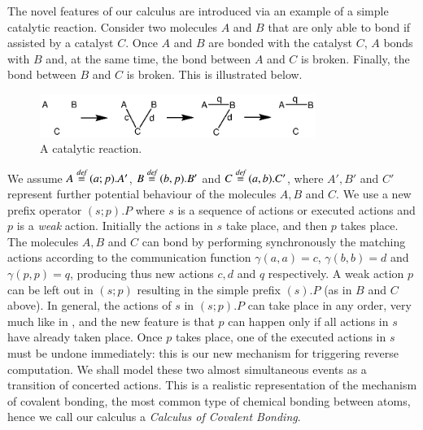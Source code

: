 The novel features of our calculus are introduced via an example of a simple catalytic reaction.
Consider two molecules $A$ and $B$ that are only able to bond if assisted by a catalyst $C$. 
Once $A$ and $B$ are bonded with the catalyst $C$, $A$ bonds with $B$ and, at the same time, 
the bond between $A$ and $C$ is broken. Finally, the bond between $B$ and $C$ is broken. 
This is illustrated below.

\begin{figure}[h!]

  \centering
    \includegraphics[width=0.8\textwidth]{exampleintro}
  \caption{A catalytic reaction.}
  \label{fig:intro}
\end{figure}

We assume $A  \stackrel{\emph{def}}{=}  (a;p).A'$, $B  \stackrel{\emph{def}}{=}  (b,p).B'$ and $C \stackrel{\emph{def}}{=}  (a,b).C'$, where
$A',B'$ and $C'$ represent further potential behaviour of the molecules $A,B$ and $C$.
We use a new prefix operator $(s;p).P$ where $s$ is a sequence of actions or executed
actions and $p$ is a \emph{weak} action. Initially the actions in $s$ take place, and then $p$ takes place.
The molecules $A,B$ and $C$ can bond by performing synchronously the
matching actions according to the communication function $\gamma(a,a)=c$, $\gamma(b,b)=d$ and
$\gamma(p,p)=q$, producing thus new actions $c,d$ and $q$ respectively. A weak action $p$ can be left out
in $(s;p)$ 
resulting in the simple prefix $(s).P$ (as in $B$ and $C$ above).
In general, the actions of $s$ in $(s;p).P$ can take place in any order, very much like in
\cite{Danos2007ccsr,Irek2012}, and the new feature is that $p$ can happen only if
all actions in $s$ have already taken place. Once $p$ takes place, one of the executed
actions in $s$ must be undone immediately: this is our new mechanism for
triggering reverse computation.  We shall model these two almost simultaneous
events as a transition of concerted actions. This is a realistic representation of the mechanism 
of covalent bonding, 
the most common type of chemical bonding between atoms, hence we call our calculus
a \emph{Calculus of Covalent Bonding}.

